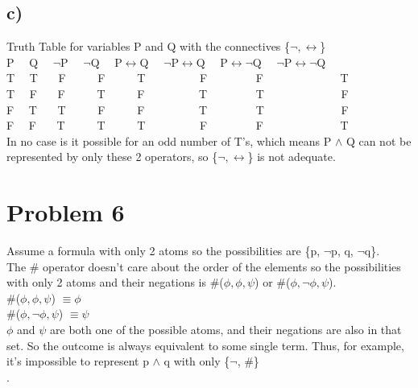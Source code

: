\documentclass[12pt,leqno,fleqn]{article}
\begin{document}
\subsection{c)}
Truth Table for variables P and Q with the connectives \{$\neg, \leftrightarrow$\}\\
P \ \ Q \ \ $\neg$P \ \ $\neg$Q \ \ P$\leftrightarrow$Q \ \ $\neg$P$\leftrightarrow$Q \ \ P$\leftrightarrow \neg$Q \ \ $\neg$P$\leftrightarrow \neg$Q\\
T \ \ T \ \ \ F \ \ \ \ \ F \ \ \ \ \ T  \ \ \ \ \ \ \ \ \ F \ \ \ \ \ \ \ \ F \ \ \ \ \ \ \ \ \ \ \ \ \ T\\
T \ \ F \ \ \ F \ \ \ \ \ T \ \ \ \ \ F  \ \ \ \ \ \ \ \ \ T \ \ \ \ \ \ \ \ T \ \ \ \ \ \ \ \ \ \ \ \ \ F\\
F \ \ T \ \ \ T \ \ \ \ \ F \ \ \ \ \ F  \ \ \ \ \ \ \ \ \ T \ \ \ \ \ \ \ \ T \ \ \ \ \ \ \ \ \ \ \ \ \ F\\
F \ \ F \ \ \ T \ \ \ \ \ T \ \ \ \ \ T  \ \ \ \ \ \ \ \ \ F \ \ \ \ \ \ \ \ F \ \ \ \ \ \ \ \ \ \ \ \ \ T\\

In no case is it possible for an odd number of T's, which means P $\land$ Q can not be represented by only these 2 operators, so \{$\neg, \leftrightarrow$\} is not adequate.

\section{Problem 6}
Assume a formula with only 2 atoms so the possibilities are \{p, $\neg$p, q, $\neg$q\}.\\
The \# operator doesn't care about the order of the elements so the possibilities with only 2 atoms and their negations is \#($\phi, \phi, \psi$) or \#($\phi, \neg \phi, \psi$).\\
 \#($\phi, \phi, \psi$) $\equiv \phi$\\
 \#($\phi, \neg \phi, \psi$) $\equiv \psi$\\
 $\phi$ and $\psi$ are both one of the possible atoms, and their negations are also in that set. So the outcome is always equivalent to some single term.
Thus, for example, it's impossible to represent p $\land$ q with only \{$\neg$, \#\}\\.
\end{document}
